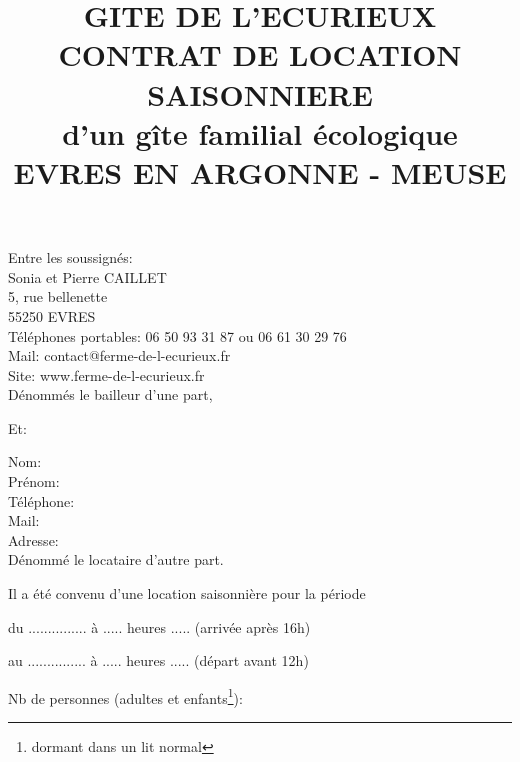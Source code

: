 \documentclass[a4paper,11pt]{article}
\title{GITE DE L'ECURIEUX\\CONTRAT DE LOCATION SAISONNIERE\\d’un gîte familial écologique\\EVRES EN ARGONNE - MEUSE}
\begin{document}
\date{}
\maketitle

\center Entre les soussignés:\\
\flushleft 
Sonia et Pierre CAILLET\\
5, rue bellenette\\
55250 EVRES\\                                                                                         
Téléphones portables: 06 50 93 31 87 ou 06 61 30 29 76 \\
Mail: contact@ferme-de-l-ecurieux.fr\\
Site: www.ferme-de-l-ecurieux.fr\\

\vspace{0.5cm}
Dénommés le bailleur d’une part,                            

\center Et:

\flushleft
Nom:\\
Prénom:\\
Téléphone:\\
Mail:\\
Adresse:\\

\vspace{0.5cm}
Dénommé le locataire d'autre part.



\flushleft
Il a été convenu d'une location saisonnière pour la période
\vspace{0.5cm}

du   ...............   à .....    heures .....    (arrivée après 16h)
\vspace{0.5cm}

au   ...............   à .....    heures .....   (départ avant 12h)
\vspace{0.5cm}

Nb de personnes (adultes et enfants\footnote{dormant dans un lit normal}): 
\vspace{0.5cm}

\newpage{}




\vspace{0.5cm}
\end{document}
